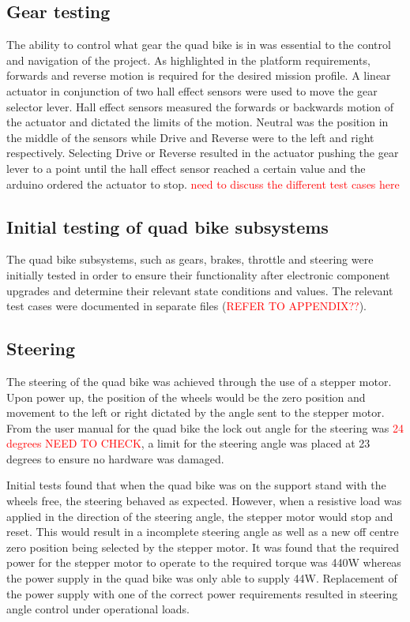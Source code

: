 \documentclass[main.tex]{subfiles}
\begin{document}
\subsection{Gear testing}
The ability to control what gear the quad bike is in was essential to the control and navigation of the project. As highlighted in the platform requirements, forwards and reverse motion is required for the desired mission profile. A linear actuator in conjunction of two hall effect sensors were used to move the gear selector lever. Hall effect sensors measured the forwards or backwards motion of the actuator and dictated the limits of the motion. Neutral was the position in the middle of the sensors while Drive and Reverse were to the left and right respectively. Selecting Drive or Reverse resulted in the actuator pushing the gear lever to a point until the hall effect sensor reached a certain value and the arduino ordered the actuator to stop. \textcolor{red}{need to discuss the different test cases here}  
\subsection{Initial testing of quad bike subsystems}
The quad bike subsystems, such as gears, brakes, throttle and steering were initially tested in order to ensure their functionality after electronic component upgrades and determine their relevant state conditions and values. The relevant test cases were documented in separate files (\textcolor{red}{REFER TO APPENDIX??}).

\subsection{Steering}
The steering of the quad bike was achieved through the use of a stepper motor. Upon power up, the position of the wheels would be the zero position and movement to the left or right dictated by the angle sent to the stepper motor. From the user manual for the quad bike the lock out angle for the steering was \textcolor{red}{24 degrees NEED TO CHECK}, a limit for the steering angle was placed at 23 degrees to ensure no hardware was damaged. 

Initial tests found that when the quad bike was on the support stand with the wheels free, the steering behaved as expected. However, when a resistive load was applied in the direction of the steering angle, the stepper motor would stop and reset. This would result in a incomplete steering angle as well as a new off centre zero position being selected by the stepper motor.  It was found that the required power for the stepper motor to operate to the required torque was 440W whereas the power supply in the quad bike was only able to supply 44W. Replacement of the power supply with one of the correct power requirements resulted in steering angle control under operational loads.
\end{document}
